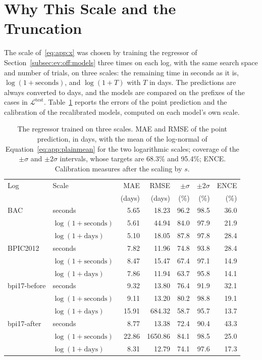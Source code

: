 \section{Why This Scale and the Truncation}
\label{sec:app:choice}
The scale of~\eqref{eq:app:x} was chosen by training the regressor of
Section~\ref{subsec:ev:off:models} three times on each log, with the same
search space and number of trials, on three scales: the remaining time in
seconds as it is, $\log(1 + \text{seconds})$, and $\log(1 + T)$ with $T$ in
days. The predictions are always converted to days, and the models are
compared on the prefixes of the cases in $\mathcal{L}^{\mathrm{test}}$.
Table~\ref{tab:app:scales} reports the errors of the point prediction and
the calibration of the recalibrated models, computed on each model's own
scale.

\begin{table}[h]
  \centering
  \small
  \begin{tabular}{llrrrrr}
    \toprule
    Log & Scale & MAE & RMSE & $\pm\sigma$ & $\pm 2\sigma$ & ENCE \\
        &       & (days) & (days) & (\%) & (\%) & (\%) \\
    \midrule
    BAC          & seconds            &  5.65 &   18.23 & 96.2 & 98.5 & 36.0 \\
                 & $\log(1 + \text{seconds})$ &  5.61 &   44.94 & 84.0 & 97.9 & 21.9 \\
                 & $\log(1 + \text{days})$    &  5.10 &   18.05 & 87.8 & 97.8 & 28.4 \\
    \midrule
    BPIC2012     & seconds            &  7.82 &   11.96 & 74.8 & 93.8 & 28.4 \\
                 & $\log(1 + \text{seconds})$ &  8.47 &   15.47 & 67.4 & 97.1 & 14.9 \\
                 & $\log(1 + \text{days})$    &  7.86 &   11.94 & 63.7 & 95.8 & 14.1 \\
    \midrule
    bpi17-before & seconds            &  9.32 &   13.80 & 76.4 & 91.9 & 32.1 \\
                 & $\log(1 + \text{seconds})$ &  9.11 &   13.20 & 80.2 & 98.8 & 19.1 \\
                 & $\log(1 + \text{days})$    & 15.91 &  684.32 & 58.7 & 95.7 & 13.7 \\
    \midrule
    bpi17-after  & seconds            &  8.77 &   13.38 & 72.4 & 90.4 & 43.3 \\
                 & $\log(1 + \text{seconds})$ & 22.86 & 1650.86 & 84.1 & 98.5 & 25.0 \\
                 & $\log(1 + \text{days})$    &  8.31 &   12.79 & 74.1 & 97.6 & 17.3 \\
    \bottomrule
  \end{tabular}
  \caption{The regressor trained on three scales. MAE and RMSE of the point
    prediction, in days, with the mean of the log-normal of
    Equation~\eqref{eq:app:plainmean} for the two logarithmic scales; coverage
    of the $\pm\sigma$ and $\pm 2\sigma$ intervals, whose targets are 68.3\%
    and 95.4\%; ENCE. Calibration measures after the scaling by $s$.}
  \label{tab:app:scales}
\end{table}

